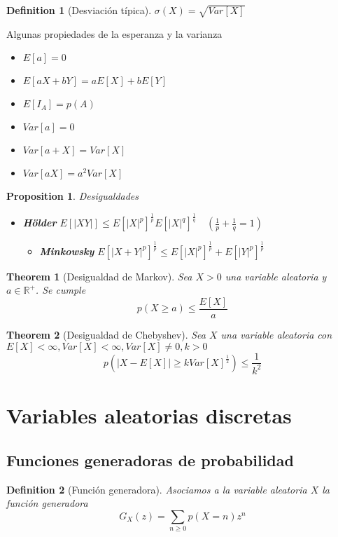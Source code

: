 \documentclass[leqno]{article}
\newtheorem*{theorem}{Theorem}
\newtheorem*{proposition}{Proposition}
\newtheorem*{definition}{Definition}
\begin{document}
\begin{definition}[Desviación típica] $\sigma (X) = \sqrt{Var[X]} $
\end{definition}

Algunas propiedades de la esperanza y la varianza
\begin{itemize}[topsep=-6pt, itemsep=0pt]
  \item $E[a]=0$
  \item  $E[aX+bY]=aE[X]+bE[Y]$
  \item  $E[I_A]=p(A)$
  \item $Var[a]=0$
  \item $Var[a+X] = Var[X]$
  \item $Var[aX]=a^2Var[X]$
\end{itemize}

\begin{proposition}
Desigualdades
\begin{itemize}[topsep=-6pt, itemsep=0pt]
  \item \textbf{Hölder} $E[|XY|] \le  E[|X|^p]^{\frac{1}{p}}E[|X|^q]^{\frac{1}{q}} \quad (\frac{1}{p}+\frac{1}{q} =1)$ 
	\begin{itemize}[topsep=-6pt, itemsep=0pt]
	  \item \textbf{Minkowsky} $E[|X+Y|^p]^{\frac{1}{p}}\le E[|X|^p]^{\frac{1}{p}}+E[|Y|^p]^{\frac{1}{p}}$ 
	\end{itemize}
\end{itemize}
\end{proposition}

\begin{theorem}[Desigualdad de Markov]
Sea $X>0$ una variable aleatoria y  $a\in \mathbb{R}^+$. Se cumple
\[
p(X\ge a)\le \frac{E[X]}{a}
\] 
\end{theorem}

\begin{theorem}[Desigualdad de Chebyshev] Sea $X$ una variable aleatoria con  $E[X]<\infty, Var[X]<\infty, Var[X]\neq 0, k>0$
  \[
  p(|X-E[X]|\ge kVar[X]^{\frac{1}{2}})\le \frac{1}{k^2}
  \] 
\end{theorem}

\section{Variables aleatorias discretas}

\subsection{Funciones generadoras de probabilidad}
\begin{definition}[Función generadora] Asociamos a la variable aleatoria $X$ la función generadora
   \[
  G_X(z) = \sum_{n\ge 0} p(X=n)z^n
  \] 
\end{definition}
\end{document}
